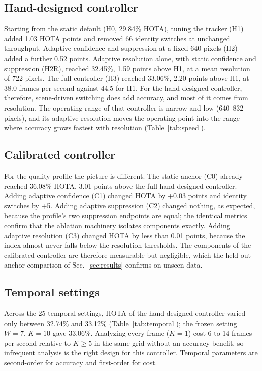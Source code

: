 \documentclass[journal]{new-aiaa}
\begin{document}
\subsection{Hand-designed controller}
Starting from the static default (H0, 29.84\% HOTA), tuning the tracker (H1) added 1.03 HOTA points and removed 66 identity switches at unchanged throughput. Adaptive confidence and suppression at a fixed 640 pixels (H2) added a further 0.52 points. Adaptive resolution alone, with static confidence and suppression (H2R), reached 32.45\%, 1.59 points above H1, at a mean resolution of 722 pixels. The full controller (H3) reached 33.06\%, 2.20 points above H1, at 38.0 frames per second against 44.5 for H1. For the hand-designed controller, therefore, scene-driven switching does add accuracy, and most of it comes from resolution. The operating range of that controller is narrow and low (640--832 pixels), and its adaptive resolution moves the operating point into the range where accuracy grows fastest with resolution (Table~\ref{tab:speed}).

\subsection{Calibrated controller}
For the quality profile the picture is different. The static anchor (C0) already reached 36.08\% HOTA, 3.01 points above the full hand-designed controller. Adding adaptive confidence (C1) changed HOTA by +0.03 points and identity switches by +5. Adding adaptive suppression (C2) changed nothing, as expected, because the profile's two suppression endpoints are equal; the identical metrics confirm that the ablation machinery isolates components exactly. Adding adaptive resolution (C3) changed HOTA by less than 0.01 points, because the index almost never falls below the resolution thresholds. The components of the calibrated controller are therefore measurable but negligible, which the held-out anchor comparison of Sec.~\ref{sec:results} confirms on unseen data.

\subsection{Temporal settings}
Across the 25 temporal settings, HOTA of the hand-designed controller varied only between 32.74\% and 33.12\% (Table~\ref{tab:temporal}); the frozen setting $W=7$, $K=10$ gave 33.06\%. Analyzing every frame ($K=1$) cost 6 to 14 frames per second relative to $K\ge5$ in the same grid without an accuracy benefit, so infrequent analysis is the right design for this controller. Temporal parameters are second-order for accuracy and first-order for cost.
\end{document}
